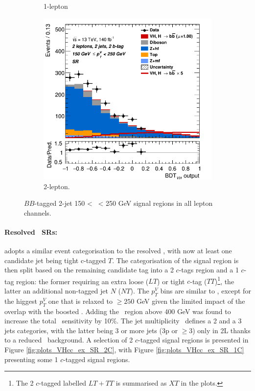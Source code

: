 \begin{figure}[h!]
\begin{subfigure}[b]{0.32\textwidth}
      \caption{1-lepton}
      \label{fig:plots_VHbb_ex_1L_SR}
  \end{subfigure}
  \begin{subfigure}[b]{0.32\textwidth}
    \centering
    \includegraphics[width=\textwidth]{Images/VH/Own_fit/prefit_VHbb/Region_distmva_BMax250_BMin150_DSR_J2_TTypebb_T2_L2_Y6051_Prefit.png}
    \caption{2-lepton.}
    \label{fig:plots_VHbb_ex_2L_SR}
\end{subfigure}
  \caption{$BB$-tagged 2-jet 150 < \ptv\ < 250 GeV signal regions in all lepton channels.}
  \label{fig:plots_VHbb_ex_SR}
\end{figure} 


\paragraph{Resolved \boldvhc\ SRs:} adopts a similar event categorisation to the resolved \vhb, with now at least one candidate jet being tight c-tagged $T$. The categorisation of the signal region is then split based on the remaining candidate tag into a 2 $c$-tags region and a 1 $c$-tag region: the former requiring an extra loose ($LT$) or tight $c$-tag ($TT$)\footnote{ The 2 $c$-tagged labelled $LT+TT$ is summarised as $XT$ in the plots.}, the latter an additional non-tagged jet $N$ ($NT$). The $p_T^V$ bins are similar to \vhb, except for the higgest $p_T^V$ one that is relaxed to $\geq 250$ GeV given the limited impact of the overlap with the boosted \vhb. Adding the \ptv\ region above 400 GeV was found to increase the total \vhc\ sensitivity by 10\%. The jet multiplicity \nj\ defines a 2 and a 3 jets categories, with the latter being 3 or more jets (3p or $\geq$3) only in 2L thanks to a reduced \ttb\ background. A selection of 2 $c$-tagged signal regions is presented in Figure \ref{fig:plots_VHcc_ex_SR_2C}, with Figure \ref{fig:plots_VHcc_ex_SR_1C} presenting some 1 $c$-tagged signal regions.

